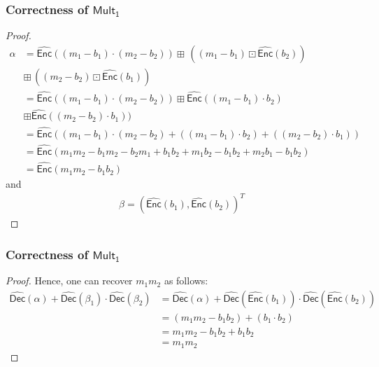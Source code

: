 \documentclass{beamer}
\begin{document}
\begin{frame}[t]
\frametitle{Correctness of $\mathsf{Mult_1}$}
\begin{proof}

\begin{align*}
\alpha&={\widehat{\mathsf{Enc}}}((m_1-b_1)\cdot(m_2-b_2)) \boxplus \,((m_1-b_1)\boxdot {\widehat{\mathsf{Enc}}}(b_2)
)\\ &\boxplus \,((m_2-b_2) \boxdot {\widehat{\mathsf{Enc}}}(b_1))\\
&={\widehat{\mathsf{Enc}}}((m_1-b_1)\cdot(m_2-b_2))\boxplus {\widehat{\mathsf{Enc}}}((m_1-b_1)\cdot b_2)\\& \boxplus {\widehat{\mathsf{Enc}}}((m_2-b_2) \cdot b_1))\\
&=\mathsf{\widehat{\mathsf{Enc}}}((m_1-b_1)\cdot(m_2-b_2 )+((m_1-b_1 )\cdot b_2 )+((m_2-b_2 )\cdot b_1))\\
&=\mathsf{\widehat{\mathsf{Enc}}}(m_1m_2-b_1m_2-b_2m_1+b_1b_2+m_1b_2-b_1b_2+m_2b_1-b_1b_2)\\
&= {\widehat{\mathsf{Enc}}}(m_1 m_2-b_1 b_2)
\end{align*}
and
\begin{align*}
\beta=({\widehat{\mathsf{Enc}}}(b_1), {\widehat{\mathsf{Enc}}}(b_2))^T
\end{align*}
\end{proof}

\end{frame}

\begin{frame}[t]
\frametitle{Correctness of $\mathsf{Mult_1}$}
\begin{proof}

Hence, one can recover $m_1m_2$ as follows:
\begin{align*}
\widehat{\mathsf{Dec}}(\alpha)+\widehat{\mathsf{Dec}}(\beta_1)\cdot \widehat{\mathsf{Dec}}(\beta_2)&=\widehat{\mathsf{Dec}}(\alpha)+\widehat{\mathsf{Dec}}({\widehat{\mathsf{Enc}}}(b_1))\cdot \widehat{\mathsf{Dec}}({\widehat{\mathsf{Enc}}}(b_2)) \\
&=(m_1 m_2-b_1 b_2)+ (b_1\cdot b_2) \nonumber \\
&=m_1 m_2-b_1 b_2+b_1b_2 \nonumber\\
&=m_1m_2 \nonumber
\end{align*}
\end{proof}
\end{frame}
\end{document}
